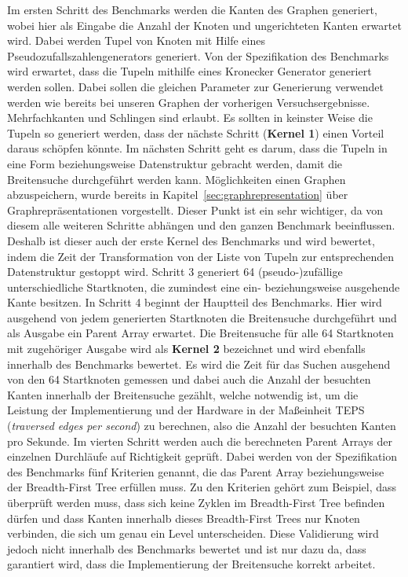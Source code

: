 \documentclass[11pt,a4paper]{article}
\begin{document}
Im ersten Schritt des Benchmarks werden die Kanten des Graphen generiert, wobei hier als Eingabe die Anzahl der Knoten und ungerichteten Kanten erwartet wird. Dabei werden Tupel von Knoten mit Hilfe eines Pseudozufallszahlengenerators generiert. Von der Spezifikation des Benchmarks wird erwartet, dass die Tupeln mithilfe eines Kronecker Generator generiert werden sollen. Dabei sollen die gleichen Parameter zur Generierung verwendet werden wie bereits bei unseren Graphen der vorherigen Versuchsergebnisse. Mehrfachkanten und Schlingen sind erlaubt. Es sollten in keinster Weise die Tupeln so generiert werden, dass der nächste Schritt (\textbf{Kernel 1}) einen Vorteil daraus schöpfen könnte. Im nächsten Schritt geht es darum, dass die Tupeln in eine Form beziehungsweise Datenstruktur gebracht werden, damit die Breitensuche durchgeführt werden kann. Möglichkeiten einen Graphen abzuspeichern, wurde bereits in Kapitel~\ref{sec:graphrepresentation} über Graphrepräsentationen vorgestellt. Dieser Punkt ist ein sehr wichtiger, da von diesem alle weiteren Schritte abhängen und den ganzen Benchmark beeinflussen. Deshalb ist dieser auch der erste Kernel des Benchmarks und wird bewertet, indem die Zeit der Transformation von der Liste von Tupeln zur entsprechenden Datenstruktur gestoppt wird.
Schritt 3 generiert 64 (pseudo-)zufällige unterschiedliche Startknoten, die zumindest eine ein- beziehungsweise ausgehende Kante besitzen. In Schritt 4 beginnt der Hauptteil des Benchmarks. Hier wird ausgehend von jedem generierten Startknoten die Breitensuche durchgeführt und als Ausgabe ein Parent Array erwartet. Die Breitensuche für alle 64 Startknoten mit zugehöriger Ausgabe wird als \textbf{Kernel 2} bezeichnet und wird ebenfalls innerhalb des Benchmarks bewertet. Es wird die Zeit für das Suchen ausgehend von den 64 Startknoten gemessen und dabei auch die Anzahl der besuchten Kanten innerhalb der Breitensuche gezählt, welche notwendig ist, um die Leistung der Implementierung und der Hardware in der Maßeinheit TEPS (\textit{traversed edges per second}) zu berechnen, also die Anzahl der besuchten Kanten pro Sekunde. Im vierten Schritt werden auch die berechneten Parent Arrays der einzelnen Durchläufe auf Richtigkeit geprüft. Dabei werden von der Spezifikation des Benchmarks fünf Kriterien genannt, die das Parent Array beziehungsweise der Breadth-First Tree erfüllen muss. Zu den Kriterien gehört zum Beispiel, dass überprüft werden muss, dass sich keine Zyklen im Breadth-First Tree befinden dürfen und dass Kanten innerhalb dieses Breadth-First Trees nur Knoten verbinden, die sich um genau ein Level unterscheiden. Diese Validierung wird jedoch nicht innerhalb des Benchmarks bewertet und ist nur dazu da, dass garantiert wird, dass die Implementierung der Breitensuche korrekt arbeitet.\\
\end{document}
